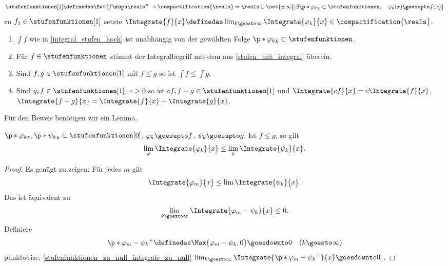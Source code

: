 \begin{definition}\label{integral_stufen_hoch}
  \begin{equation*}
    \stufenfunktionen[1]\definedas \Set{f\maps \reals^n\to \compactification{\reals}=\reals\cup \set{\pm \infty}|\exists \p*{\varphi_k}_k\subset \stufenfunktionen,\quad \varphi_k(x)\goesupto f(x)}
  \end{equation*}
  zu \( f_1\in \stufenfunktionen[1] \) setzte \( \Integrate{f}{x}\definedas \lim_{k \goesto \infty}\Integrate{\varphi_k}{x}\in \compactification{\reals} \).
\end{definition}
\begin{satz}\label{integral_stufen_hoch_eigenschaften}
  \begin{enumerate}
    \item \label{integral_stufen_hoch_unabhaengig_von_stufenfolge}\( \int f \) wie in \ref{integral_stufen_hoch} ist unabhängig von der gewählten Folge \( \p*{\varphi_k}_k\subset \stufenfunktionen \).
    \item \label{integral_stufen_hoch_gleich_stufenintegral} Für \( f\in \stufenfunktionen \) stimmt der Integralbegriff mit dem aus \ref{stufen_mit_integral} überein.
    \item \label{integral_stufen_hoch_funktionenungleichung_integralungleichung} Sind \( f,g\in \stufenfunktionen[1] \) mit \( f\leq g \) so ist \( \int f\leq \int g \).
    \item \label{integral_stufen_hoch_linear} Sind \( g,f\in \stufenfunktionen[1] \), \( c\geq 0 \) so ist \( cf,f+g\in \stufenfunktionen[1] \) und \( \Integrate{cf}{x}=c\Integrate{f}{x} \), \( \Integrate{f+g}{x}=\Integrate{f}{x}+\Integrate{g}{x} \).
  \end{enumerate}
\end{satz}
Für den Beweis benötigen wir ein Lemma.
\begin{lemma}\label{funktionenungleichung_grenzwertungleichung_stufenfunktionen_hoch_zu}
  \( \p*{\varphi_k}_k,\p*{\psi_k}_k\subset \stufenfunktionen[0] \), \( \varphi_k\goesupto f \), \( \psi_k\goesupto g \). Ist \( f\leq g \), so gilt
  \begin{equation*}
    \lim_k \Integrate{\varphi_k}{x}\leq \lim_k \Integrate{\psi_k}{x}.
  \end{equation*}
\end{lemma}
\begin{proof}
  Es genügt zu zeigen: Für jedes \( m \) gilt
  \begin{equation*}
    \Integrate{\varphi_m}{x}\leq \lim \Integrate{\psi_k}{x}.
  \end{equation*}
  Das ist äquivalent zu
  \begin{equation*}
    \lim_{k \goesto \infty}\Integrate{\varphi_m-\psi_k}{x}\leq 0.
  \end{equation*}
  Definiere
  \begin{equation*}
    \p*{\varphi_m-\psi_k}^{+}\definedas \Max{\varphi_m-\psi_k,0}\goesdownto 0 \quad (k\goesto \infty)
  \end{equation*}
  punktweise. \ref{stufenfunktionen_zu_null_integrale_zu_null} \timplies \( \lim_{k\goesto \infty}\Integrate{\p*{\varphi_m-\psi   _k}^{+}}{x}\goesdownto 0 \) \timplies \Beh.
\end{proof}
